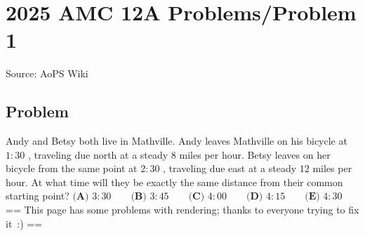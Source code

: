 \documentclass[12pt]{article}
\begin{document}
\section*{{2025 AMC 12A Problems/Problem 1}}
Source: AoPS Wiki

\subsection*{Problem}
Andy and Betsy both live in Mathville. Andy leaves Mathville on his bicycle at $1{:}30$ , traveling due north at a steady $8$ miles per hour. Betsy leaves on her bicycle from the same point at $2{:}30$ , traveling due east at a steady $12$ miles per hour. At what time will they be exactly the same distance from their common starting point? $\textbf{(A) } 3{:}30 \qquad \textbf{(B) } 3{:}45 \qquad \textbf{(C) } 4{:}00 \qquad \textbf{(D) } 4{:}15 \qquad \textbf{(E) } 4{:}30$ == This page has some problems with rendering; thanks to everyone trying to fix it :)
==
\end{document}
